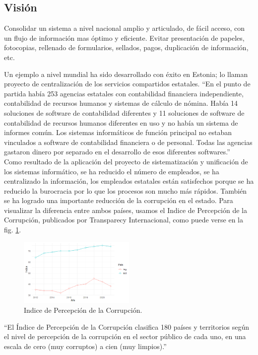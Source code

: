 \documentclass[a4paper]{article}
\begin{document}
\subsection{Visión} 

Consolidar un sistema a nivel nacional amplio y articulado, de fácil acceso, con un flujo de información mas óptimo y eficiente. Evitar presentación de papeles, fotocopias, rellenado de formularios, sellados, pagos, duplicación de información, etc. 

Un ejemplo a nivel mundial ha sido desarrollado con éxito en Estonia; lo llaman proyecto de centralización de los servicios compartidos estatales. “En el punto de partida había 253 agencias estatales con contabilidad financiera independiente, contabilidad de recursos humanos y sistemas de cálculo de nómina. Había 14 soluciones de software de contabilidad diferentes y 11 soluciones de software de contabilidad de recursos humanos diferentes en uso y no había un sistema de informes común. Los sistemas informáticos de función principal no estaban vinculados a software de contabilidad financiera o de personal. Todas las agencias gastaron dinero por separado en el desarrollo de esos diferentes softwares.” ~\cite{estonia}
Como resultado de la aplicación del proyecto de sistematización y unificación de los sistemas informático, se ha reducido el número de empleados, se ha centralizado la información, los empleados estatales están satisfechos porque se ha reducido la burocracia por lo que los procesos son mucho más rápidos. También se ha logrado una importante reducción de la corrupción en el estado. Para visualizar la diferencia entre ambos países, usamos el Indice de Percepción de la Corrupción, publicados por Transparecy Internacional, como puede verse en la fig. \ref{fig:Imagen1}.

\begin{figure}
\centering
\includegraphics[width=0.5\textwidth]{Imagen1.png}
\caption{\label{fig:Imagen1}Indice de Percepción de la Corrupción.}
\end{figure}

“El Índice de Percepción de la Corrupción clasifica 180 países y territorios según el nivel de percepción de la corrupción en el sector público de cada uno, en una escala de cero (muy corruptos) a cien (muy limpios).” ~\cite{ipc}
\end{document}

